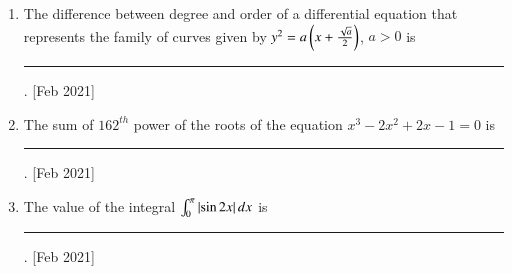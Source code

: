 \documentclass[journal]{IEEEtran}
\begin{document}
\begin{enumerate}
    \item The difference between degree and order of a differential equation that
    represents the family of curves given by $y^2 = a \left(x + \frac{\sqrt{a}}{2}\right)$,
    $a > 0$ is \rule{1cm}{0.15mm}.
    \hfill{[Feb 2021]}

    \item The sum of $162^{th}$ power of the roots of the equation
    $x^3 - 2x^2 + 2x - 1 = 0$ is \\
    \rule{1cm}{0.15mm}. \hfill{[Feb 2021]}

    \item The value of the integral $\int_0^\pi \left\vert\sin 2x\right\vert dx$ is \rule{1cm}{0.15mm}.
    \hfill{[Feb 2021]}

\end{enumerate}
\end{document}
